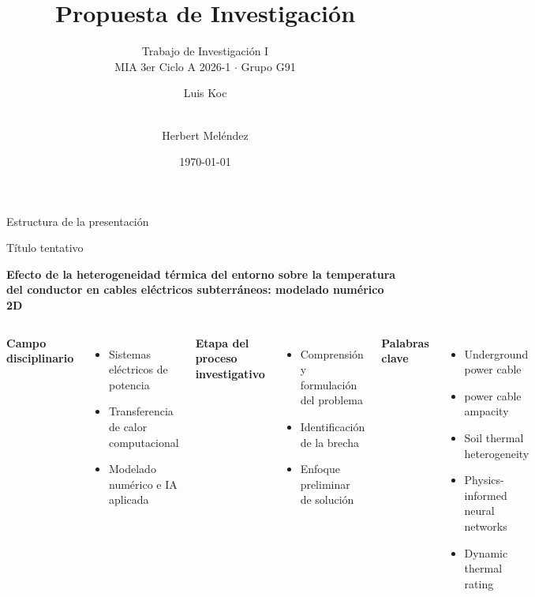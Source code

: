 \documentclass[aspectratio=169]{beamer}
\title{Propuesta de Investigación}
\subtitle{Trabajo de Investigación I\\MIA 3er Ciclo A 2026-1 $\cdot$ Grupo G91}
\author{Luis Koc \and \\ Herbert Meléndez}
\date{\today}
\begin{document}
\begin{frame}
  \titlepage
\end{frame}

\begin{frame}{Estructura de la presentación}
\tableofcontents[hideallsubsections]
\end{frame}
\begin{frame}{Título tentativo}

\begin{block}{}
\centering\large
\textbf{Efecto de la heterogeneidad térmica del entorno sobre la temperatura del conductor en cables eléctricos subterráneos: modelado numérico 2D}
\par\vspace{0.35em}

\end{block}

\vspace{0.8em}
\begin{columns}[T]
\textbf{Campo disciplinario}
\begin{itemize}[leftmargin=*]\small
    \item Sistemas eléctricos de potencia
    \item Transferencia de calor computacional
    \item Modelado numérico e IA aplicada
\end{itemize}
\textbf{Etapa del proceso investigativo}
\begin{itemize}[leftmargin=*]\small
    \item Comprensión y formulación del problema
    \item Identificación de la brecha
    \item Enfoque preliminar de solución
\end{itemize}

\textbf{Palabras clave}
\begin{itemize}[leftmargin=*]\small
    \item Underground power cable
    \item power cable ampacity
    \item Soil thermal heterogeneity
    \item Physics-informed neural networks
    \item Dynamic thermal rating
\end{itemize}

\end{columns}
\end{frame}
\end{document}
